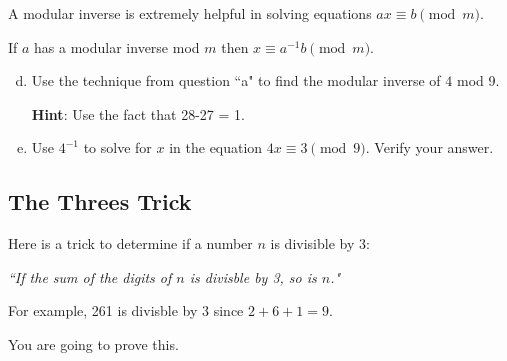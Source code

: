 \documentclass[12pt,letterpaper]{article}
\newcommand\hint[1]{\textbf{Hint}: #1}
\begin{document}
		A modular inverse is extremely helpful in solving equations $ax \equiv b \pmod{m}$.

		If $a$ has a modular inverse mod ${m}$ then $x \equiv a^{-1}b \pmod{m}$.

		
		\begin{enumerate}[a.]
					\setcounter{enumi}{3}
			\item Use the technique from question ``a" to find the modular inverse of $4$ mod 9.

			\hint Use the fact that 28-27 = 1.
			
			\begin{mdframed}
			\vspace{3cm}
			\end{mdframed}

			\item Use $4^{-1}$ to solve for $x$ in the equation $4x \equiv 3 \pmod{9}$. Verify your answer.

			\begin{mdframed}
			\vspace{3cm}
			\end{mdframed}
			
		\end{enumerate}

		\subsection*{The Threes Trick}

		Here is a trick to determine if a number $n$ is divisible by 3:
		
		\textit{``If the sum of the digits of $n$ is divisble by 3, so is $n$."}

		For example, 261 is divisble by 3 since $2+6+1 = 9$.

		You are going to prove this.
\end{document}
